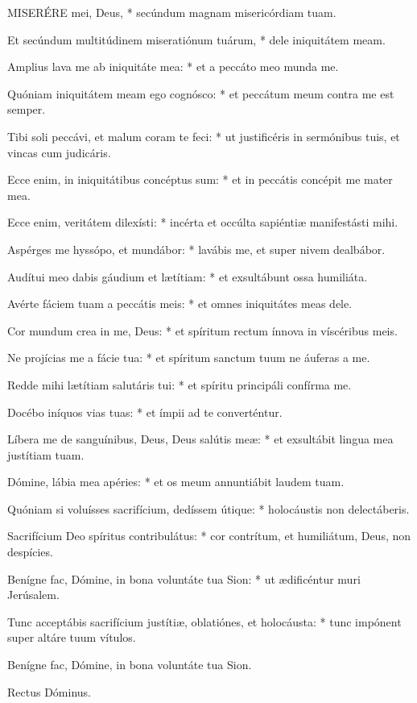 
\lettrine[lines=2]{M}{ISERÉRE} mei, Deus, * secúndum magnam misericórdiam tuam.

Et secúndum multitúdinem miseratiónum tuárum, * dele iniquitátem meam.

Amplius lava me ab iniquitáte mea: * et a peccáto meo munda me.

Quóniam iniquitátem meam ego cognósco: * et peccátum meum contra me est semper.

Tibi soli peccávi, et malum coram te feci: * ut justificéris in sermónibus tuis, et vincas cum judicáris.

Ecce enim, in iniquitátibus concéptus sum: * et in peccátis concépit me mater mea.

Ecce enim, veritátem dilexísti: * incérta et occúlta sapiéntiæ manifestásti mihi.

Aspérges me hyssópo, et mundábor: * lavábis me, et super nivem dealbábor.

Audítui meo dabis gáudium et lætítiam: * et exsultábunt ossa humiliáta.

Avérte fáciem tuam a peccátis meis: * et omnes iniquitátes meas dele.

Cor mundum crea in me, Deus: * et spíritum rectum ínnova in víscéribus meis.

Ne projícias me a fácie tua: * et spíritum sanctum tuum ne áuferas a me.

Redde mihi lætítiam salutáris tui: * et spíritu principáli confírma me.

Docébo iníquos vias tuas: * et ímpii ad te converténtur.

Líbera me de sanguínibus, Deus, Deus salútis meæ: * et exsultábit lingua mea justítiam tuam.

Dómine, lábia mea apéries: * et os meum annuntiábit laudem tuam.

Quóniam si voluísses sacrifícium, dedíssem útique: * holocáustis non delectáberis.

Sacrifícium Deo spíritus contribulátus: * cor contrítum, et humiliátum, Deus, non despícies.

Benígne fac, Dómine, in bona voluntáte tua Sion: * ut ædificéntur muri Jerúsalem.

Tunc acceptábis sacrifícium justítiæ, oblatiónes, et holocáusta: * tunc impónent super altáre tuum vítulos.

 Benígne fac, Dómine, in bona voluntáte tua Sion.

 Rectus Dóminus.

